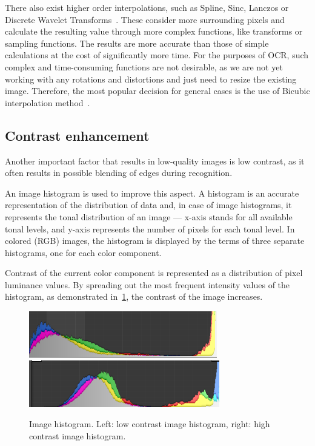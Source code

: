There also exist higher order interpolations, such as Spline, Sinc, Lanczos or Discrete Wavelet Transforms~\cite{interpolation}. These consider more surrounding pixels and calculate the resulting value through more complex functions, like transforms or sampling functions. The results are more accurate than those of simple calculations at the cost of significantly more time. For the purposes of OCR, such complex and time-consuming functions are not desirable, as we are not yet working with any rotations and distortions and just need to resize the existing image. Therefore, the most popular decision for general cases is the use of Bicubic interpolation method~\cite{interpolationComp}.

\subsection{Contrast enhancement}

Another important factor that results in low-quality images is low contrast, as it often results in possible blending of edges during recognition.

An image histogram is used to improve this aspect. A histogram is an accurate representation of the distribution of data and, in case of image histograms, it represents the tonal distribution of an image --- x-axis stands for all available tonal levels, and y-axis represents the number of pixels for each tonal level. In colored (RGB) images, the histogram is displayed by the terms of three separate histograms, one for each color component.

Contrast of the current color component is represented as a distribution of pixel luminance values. By spreading out the most frequent intensity values of the histogram, as demonstrated in~\cref{fig:preprocessContrastComparison}, the contrast of the image increases.

\begin{figure}[t]
\centering
\includegraphics[width=0.4\linewidth]{img/preprocessing//histogram_low.png}
\qquad
\includegraphics[width=0.4\linewidth]{img/preprocessing/histogram_high.png}
\caption{Image histogram. Left: low contrast image histogram, right: high contrast image histogram.}
\label{fig:preprocessContrastComparison}
\end{figure}

